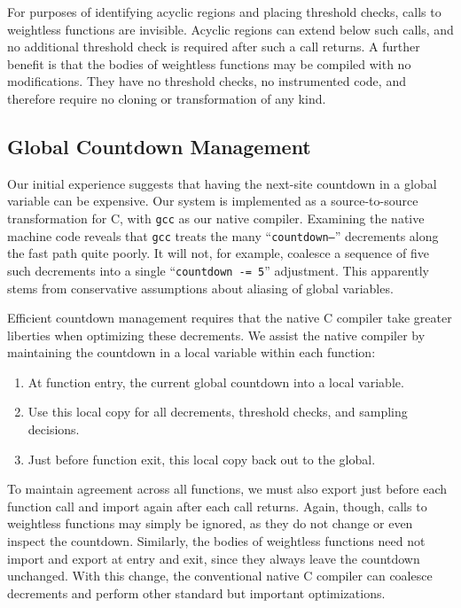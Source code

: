 For purposes of identifying acyclic regions and placing threshold
checks, calls to weightless functions are invisible.  Acyclic regions
can extend below such calls, and no additional threshold check is
required after such a call returns.  A further benefit is that the
bodies of weightless functions may be compiled with no modifications.
They have no threshold checks, no instrumented code, and therefore
require no cloning or transformation of any kind.

\subsection{Global Countdown Management}

Our initial experience suggests that having the next-site countdown in
a global variable can be expensive.  Our system is implemented as a
source-to-source transformation for C, with \texttt{gcc} as our native
compiler.  Examining the native machine code reveals that \texttt{gcc}
treats the many ``\texttt{countdown--}'' decrements along the fast
path quite poorly.  It will not, for example, coalesce a sequence of
five such decrements into a single ``\texttt{countdown -= 5}''
adjustment.  This apparently stems from conservative assumptions about
aliasing of global variables.

Efficient countdown management requires that the native C compiler
take greater liberties when optimizing these decrements.  We assist
the native compiler by maintaining the countdown in a local variable
within each function:

\begin{enumerate}
\item At function entry,  the current global countdown
  into a local variable.
\item Use this local copy for all decrements, threshold checks, and
  sampling decisions.
\item Just before function exit,  this local copy back
  out to the global.
\end{enumerate}

To maintain agreement across all functions, we must also
export just before each function call and import again after each call
returns.  Again, though, calls to weightless functions may simply be
ignored, as they do not change or even inspect the countdown.
Similarly, the bodies of weightless functions need not import and
export at entry and exit, since they always leave the countdown
unchanged.  With this change, the conventional native C compiler can
coalesce decrements and perform other standard but important
optimizations.

